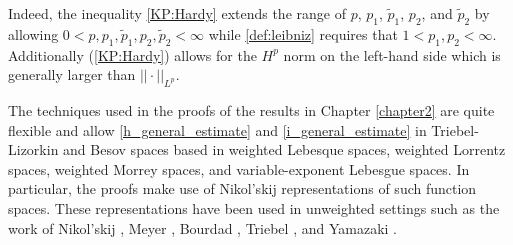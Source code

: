 %

 Indeed, the inequality \eqref{KP:Hardy} extends the range of $p$, $p_1$, $\tilde{p}_1$, $p_2$, and $\tilde{p}_2$ by allowing $0<p,p_1,\tilde{p}_1,p_2,\tilde{p}_2<\infty$ while \eqref{def:leibniz} requires that $1<p_1,p_2<\infty$. Additionally (\ref{KP:Hardy}) allows for the $H^p$ norm on the left-hand side which is generally larger than $||\cdot||_{L^p}$. 
  
The techniques used in the proofs of the results in Chapter \ref{chapter2} are quite flexible and allow \eqref{h_general_estimate} and \eqref{i_general_estimate} in Triebel-Lizorkin and Besov spaces based in weighted Lebesque spaces, weighted Lorrentz spaces, weighted Morrey spaces, and variable-exponent Lebesgue spaces.
In particular, the proofs make use of Nikol'skij representations of such function spaces. These representations have been used in unweighted settings such as the work of Nikol'skij \citep{MR0374877}, Meyer \citep{MR639462}, Bourdad \citep{MR673825}, Triebel \citep{MR3024598}, and Yamazaki \citep{MR837335}. 

